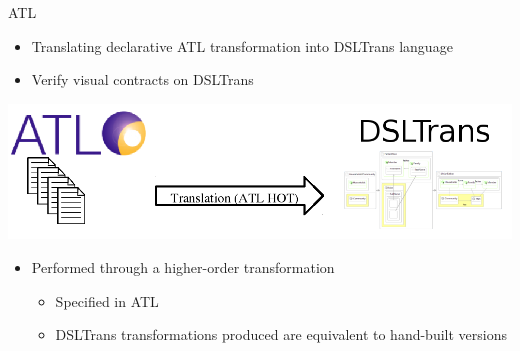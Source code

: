 \documentclass[12pt, handout]{beamer}
\begin{document}
\begin{frame}{ATL}

\begin{itemize}[<+->]
\item Translating declarative ATL transformation into DSLTrans language
\item Verify visual contracts on DSLTrans
\end{itemize}
\begin{center}
\includegraphics[width=\textwidth]{figures/overview}
\end{center}
\begin{itemize}[<+->]
\item Performed through a higher-order transformation
\begin{itemize}
\item Specified in ATL
\item DSLTrans transformations produced are equivalent to hand-built versions
\end{itemize}
\end{itemize}
\end{frame}
\end{document}
